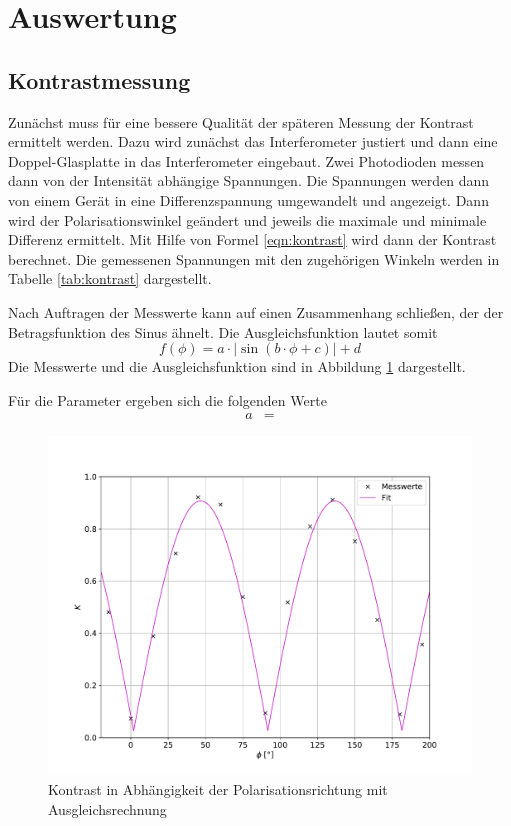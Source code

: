 \section{Auswertung}
\subsection{Kontrastmessung}
Zunächst muss für eine bessere Qualität der späteren Messung der Kontrast
ermittelt werden. Dazu wird zunächst das Interferometer justiert und dann eine
Doppel-Glasplatte in das Interferometer eingebaut. Zwei Photodioden messen dann
 von der Intensität abhängige Spannungen. Die Spannungen werden dann von einem
Gerät in eine Differenzspannung umgewandelt und angezeigt. Dann wird der
Polarisationswinkel geändert und jeweils die maximale und minimale Differenz
ermittelt. Mit Hilfe von Formel \eqref{eqn:kontrast} wird dann der Kontrast
berechnet. Die gemessenen Spannungen mit den zugehörigen Winkeln werden in
Tabelle \ref{tab:kontrast} dargestellt.



Nach Auftragen der Messwerte kann auf einen Zusammenhang schließen, der der
Betragsfunktion des Sinus ähnelt. Die Ausgleichsfunktion lautet somit
\begin{equation}
  f(\phi) = a \cdot \lvert \sin(b \cdot \phi +c) \rvert +d
\end{equation}
Die Messwerte und die Ausgleichsfunktion sind in Abbildung \ref{fig:kontrast}
dargestellt.

Für die Parameter ergeben sich die folgenden Werte
\begin{align*}
  a &= 
\end{align*}

\begin{figure}[H]
  \centering
  \includegraphics[width=\textwidth]{kontrast.pdf}
  \caption{Kontrast in Abhängigkeit der Polarisationsrichtung mit
  Ausgleichsrechnung}
  \label{fig:kontrast}
\end{figure}
